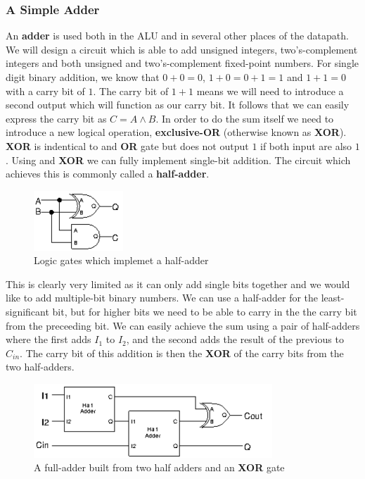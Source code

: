 \documentclass{article}
\begin{document}
	\subsubsection{A Simple Adder}
	An \textbf{adder} is used both in the ALU and in several other places of the datapath. We will design a circuit which is able to add unsigned integers, two's-complement integers and both unsigned and two's-complement fixed-point numbers. For single digit binary addition, we know that $0 + 0 = 0$, $1 + 0 = 0 + 1 = 1$ and $1 + 1 = 0$ with a carry bit of $1$. The carry bit of $1 + 1$ means we will need to introduce a second output which will function as our carry bit. It follows that we can easily express the carry bit as $C = A \wedge B$. In order to do the sum itself we need to introduce a new logical operation, \textbf{exclusive-OR} (otherwise known as \textbf{XOR}). \textbf{XOR} is indentical to and \textbf{OR} gate but does not output $1$ if both input are also $1$. Using and \textbf{XOR} we can fully implement single-bit addition. The circuit which achieves this is commonly called a \textbf{half-adder}.
	
	\begin{figure}[ht]
		\centering
		\includegraphics[width=0.3\textwidth]{single_bit_adder}
		\caption{Logic gates which implemet a half-adder}
		\label{fig:half adder}
	\end{figure}
	
	This is clearly very limited as it can only add single bits together and we would like to add multiple-bit binary numbers. We can use a half-adder for the least-significant bit, but for higher bits we need to be able to carry in the the carry bit from the preceeding bit. We can easily achieve the sum using a pair of half-adders where the first adds $I_{1}$ to $I_{2}$, and the second adds the result of the previous to $C_{in}$. The carry bit of this addition is then the \textbf{XOR} of the carry bits from the two half-adders.
	
	\begin{figure}[ht]
		\centering
		\includegraphics[width=0.8\textwidth]{full_adder}
		\caption{A full-adder built from two half adders and an \textbf{XOR} gate}
		\label{fig:full_adder}
	\end{figure}
	
\end{document}
